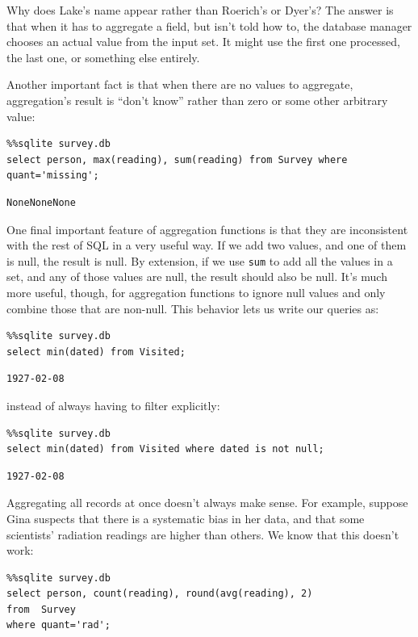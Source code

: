 \documentclass{book}
\begin{document}
Why does Lake's name appear rather than Roerich's or Dyer's? The answer
is that when it has to aggregate a field, but isn't told how to, the
database manager chooses an actual value from the input set. It might
use the first one processed, the last one, or something else entirely.

Another important fact is that when there are no values to aggregate,
aggregation's result is ``don't know'' rather than zero or some other
arbitrary value:

\begin{verbatim}
%%sqlite survey.db
select person, max(reading), sum(reading) from Survey where quant='missing';
\end{verbatim}

\begin{verbatim}
NoneNoneNone
\end{verbatim}

One final important feature of aggregation functions is that they are
inconsistent with the rest of SQL in a very useful way. If we add two
values, and one of them is null, the result is null. By extension, if we
use \texttt{sum} to add all the values in a set, and any of those values
are null, the result should also be null. It's much more useful, though,
for aggregation functions to ignore null values and only combine those
that are non-null. This behavior lets us write our queries as:

\begin{verbatim}
%%sqlite survey.db
select min(dated) from Visited;
\end{verbatim}

\begin{verbatim}
1927-02-08
\end{verbatim}

instead of always having to filter explicitly:

\begin{verbatim}
%%sqlite survey.db
select min(dated) from Visited where dated is not null;
\end{verbatim}

\begin{verbatim}
1927-02-08
\end{verbatim}

Aggregating all records at once doesn't always make sense. For example,
suppose Gina suspects that there is a systematic bias in her data, and
that some scientists' radiation readings are higher than others. We know
that this doesn't work:

\begin{verbatim}
%%sqlite survey.db
select person, count(reading), round(avg(reading), 2)
from  Survey
where quant='rad';
\end{verbatim}
\end{document}
